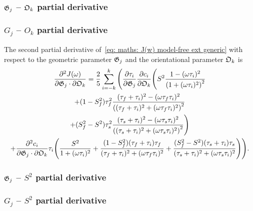 \begin{latexonly}
    \subsubsection{$\mathfrak{G}_j$ -- $\mathfrak{O}_k$ partial derivative}
\end{latexonly}
\begin{htmlonly}
    \subsubsection{$G_j$ -- $O_k$ partial derivative}
\end{htmlonly}

The second partial derivative of~\eqref{eq: maths: J(w) model-free ext generic} with respect to the geometric parameter $\mathfrak{G}_j$ and the orientational parameter $\mathfrak{O}_k$ is
\begin{multline}
    \frac{\partial^2 J(\omega)}{\partial \mathfrak{G}_j \cdot \partial \mathfrak{O}_k} = \frac{2}{5} \sum_{i=-k}^k \Bigg(
        \frac{\partial \tau_i}{\partial \mathfrak{G}_j} \frac{\partial c_i}{\partial \mathfrak{O}_k} \Bigg(
            S^2 \frac{1 - (\omega \tau_i)^2}{\left(1 + (\omega \tau_i)^2 \right)^2} \\
            + (1 - S^2_f) \tau_f^2 \frac{(\tau_f + \tau_i)^2 - (\omega \tau_f \tau_i)^2}{\left((\tau_f + \tau_i)^2 + (\omega \tau_f \tau_i)^2 \right)^2} \\
            + (S^2_f - S^2) \tau_s^2 \frac{(\tau_s + \tau_i)^2 - (\omega \tau_s \tau_i)^2}{\left((\tau_s + \tau_i)^2 + (\omega \tau_s \tau_i)^2 \right)^2}
        \Bigg) \\
        +  \frac{\partial^2 c_i}{\partial \mathfrak{G}_j \cdot \partial \mathfrak{O}_k} \tau_i \Bigg(
            \frac{S^2}{1 + (\omega \tau_i)^2}
            + \frac{(1 - S^2_f)(\tau_f + \tau_i)\tau_f}{(\tau_f + \tau_i)^2 + (\omega \tau_f \tau_i)^2}
            + \frac{(S^2_f - S^2)(\tau_s + \tau_i)\tau_s}{(\tau_s + \tau_i)^2 + (\omega \tau_s \tau_i)^2}
        \Bigg)
    \Bigg).
\end{multline}



\begin{latexonly}
    \subsubsection{$\mathfrak{G}_j$ -- $S^2$ partial derivative}
\end{latexonly}
\begin{htmlonly}
    \subsubsection{$G_j$ -- $S^2$ partial derivative}
\end{htmlonly}


